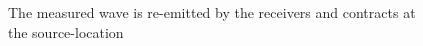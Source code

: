 \begin{figure}[ht]
\begin{minipage}{0.45\textwidth}
        \caption*{The measured wave is re-emitted by the receivers and contracts at the source-location}\label{fig:WaveTimeReversalContraction}
    \end{minipage}
\end{figure}